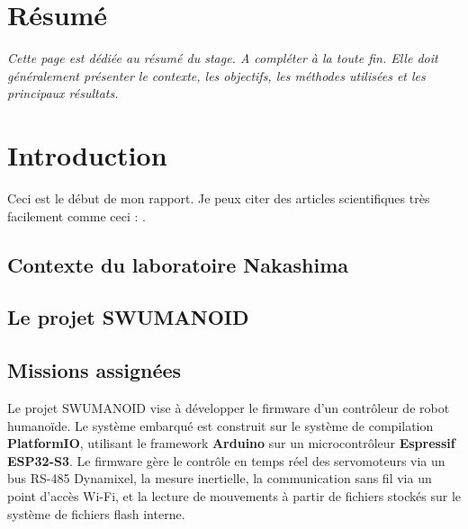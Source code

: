 \documentclass{tropLaClasse}
\begin{document}
\fairemarges
\fairepagedegarde

\clearpage
\pagestyle{empty} %
\section*{Résumé}
\textit{Cette page est dédiée au résumé du stage. A compléter à la toute fin. Elle doit généralement présenter le contexte, les objectifs, les méthodes utilisées et les principaux résultats.}

\clearpage
\setcounter{page}{1}
\pagestyle{plain} %
\tabledematieres  %

\section{Introduction}
Ceci est le début de mon rapport. Je peux citer des articles scientifiques très facilement comme ceci : \cite{nakashima_2024}.

\subsection{Contexte du laboratoire Nakashima}
\lipsum[1]

\subsection{Le projet SWUMANOID}

\lipsum[1]

\newpage

\subsection{Missions assignées}

Le projet SWUMANOID vise à développer le firmware d'un contrôleur de robot humanoïde. Le système embarqué est construit sur le système de compilation \textbf{PlatformIO}, utilisant le framework \textbf{Arduino} sur un microcontrôleur \textbf{Espressif ESP32-S3}. Le firmware gère le contrôle en temps réel des servomoteurs via un bus RS-485 Dynamixel, la mesure inertielle, la communication sans fil via un point d'accès Wi-Fi, et la lecture de mouvements à partir de fichiers stockés sur le système de fichiers flash interne.
\end{document}

